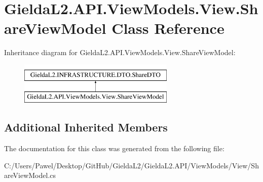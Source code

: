 \hypertarget{class_gielda_l2_1_1_a_p_i_1_1_view_models_1_1_view_1_1_share_view_model}{}\section{Gielda\+L2.\+A\+P\+I.\+View\+Models.\+View.\+Share\+View\+Model Class Reference}
\label{class_gielda_l2_1_1_a_p_i_1_1_view_models_1_1_view_1_1_share_view_model}
Inheritance diagram for Gielda\+L2.\+A\+P\+I.\+View\+Models.\+View.\+Share\+View\+Model\+:\begin{figure}[H]
\begin{center}
\leavevmode
\includegraphics[height=2.000000cm]{class_gielda_l2_1_1_a_p_i_1_1_view_models_1_1_view_1_1_share_view_model}
\end{center}
\end{figure}
\subsection*{Additional Inherited Members}


The documentation for this class was generated from the following file\+:\begin{DoxyCompactItemize}
\item 
C\+:/\+Users/\+Pawel/\+Desktop/\+Git\+Hub/\+Gielda\+L2/\+Gielda\+L2.\+A\+P\+I/\+View\+Models/\+View/Share\+View\+Model.\+cs\end{DoxyCompactItemize}
